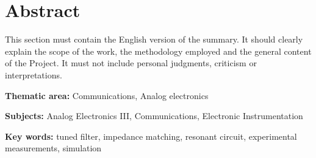 \chapter*{Abstract}

This section must contain the English version of the summary. It should clearly explain the scope of the work, the methodology employed and the general content of the Project. It must not include personal judgments, criticism or interpretations.

\vspace{1cm}

\noindent\textbf{Thematic area:} Communications, Analog electronics

\vspace{0.5cm}

\noindent\textbf{Subjects:} Analog Electronics III, Communications, Electronic Instrumentation

\vspace{0.5cm}

\noindent\textbf{Key words:} tuned filter, impedance matching, resonant circuit, experimental measurements, simulation